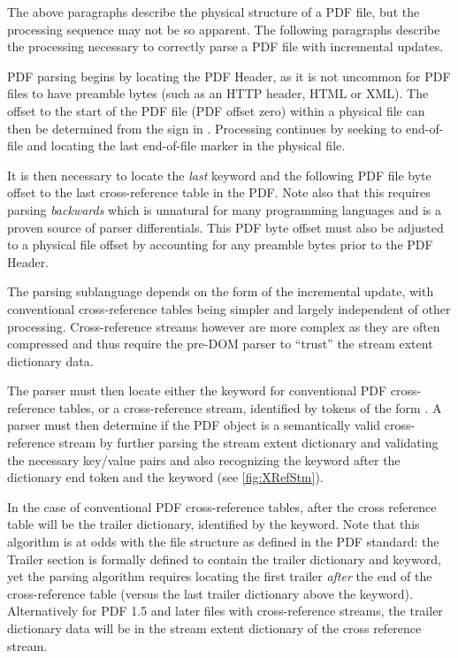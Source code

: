 The above paragraphs describe the physical structure of a PDF file, but the processing sequence may not be so apparent. 
The following paragraphs describe the processing necessary to correctly parse a PDF file with incremental updates.

PDF parsing begins by locating the PDF Header, as it is not uncommon for PDF files to have 
preamble bytes (such as an HTTP header, HTML or XML). The offset to the start of the PDF file 
(PDF offset zero)
within a physical file can then be determined from the \lstcd{\%} sign in . 
Processing continues by seeking to end-of-file and locating the last end-of-file marker  in the physical file.

It is then necessary to locate the \emph{last}  keyword and the following PDF file byte offset 
to the last cross-reference table in the PDF. Note also that this requires parsing \emph{backwards}
which is unnatural for many programming languages and is a proven source of parser differentials. 
This PDF byte offset must also be adjusted to a physical file offset by accounting for any preamble bytes prior to the PDF Header.

The parsing sublanguage depends on the form of the incremental update, with
conventional cross-reference tables being simpler and largely independent of
other processing. Cross-reference streams however are more complex as they are
often compressed and thus require the pre-DOM parser to ``trust'' the stream
extent dictionary data.

The parser must then locate either the  keyword for
conventional PDF cross-reference tables, or a cross-reference stream, identified by tokens of the form  . 
A parser must then determine if the PDF object is a
semantically valid cross-reference stream by further parsing the stream extent dictionary and 
validating the necessary key/value pairs and also recognizing the  keyword after the dictionary end token \lstcd{>>} and the  keyword (see \cref{fig:XRefStm}). 

In the case of conventional PDF
cross-reference tables, after the cross reference table will be the
trailer dictionary, identified by the  keyword. 
Note that this algorithm is at
odds with the file structure as defined in the PDF standard: the Trailer section is formally defined
to contain the trailer dictionary and  keyword, yet the parsing algorithm
requires locating the first trailer \emph{after} the end of the cross-reference table 
(versus the last trailer dictionary above the  keyword). 
Alternatively for PDF 1.5 and later files with cross-reference
streams, the trailer dictionary data will be in the stream extent
dictionary of the cross reference stream. 

